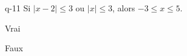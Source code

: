 \begin{truefalse}{q-11}
Si $|x-2|\leq 3$ ou $|x|\leq 3$, alors $-3\leq x \leq 5$.
\item* Vrai
\item Faux
\end{truefalse}

